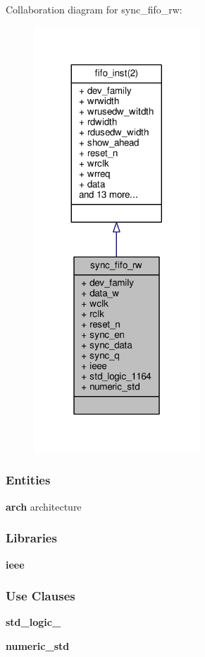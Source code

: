 Collaboration diagram for sync\+\_\+fifo\+\_\+rw\+:\nopagebreak
\begin{figure}[H]
\begin{center}
\leavevmode
\includegraphics[width=176pt]{dc/ded/classsync__fifo__rw__coll__graph}
\end{center}
\end{figure}
\subsubsection*{Entities}
\begin{DoxyCompactItemize}
\item 
{\bf arch} architecture
\end{DoxyCompactItemize}
\subsubsection*{Libraries}
 \begin{DoxyCompactItemize}
\item 
{\bf ieee} 
\end{DoxyCompactItemize}
\subsubsection*{Use Clauses}
 \begin{DoxyCompactItemize}
\item 
{\bf std\+\_\+logic\+\_}   
\item 
{\bf numeric\+\_\+std}   
\end{DoxyCompactItemize}

